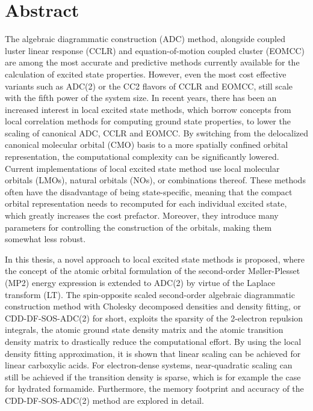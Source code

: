 \chapter*{Abstract}

The algebraic diagrammatic construction (ADC) method, alongside coupled luster linear response (CCLR) and equation-of-motion coupled cluster (EOMCC) are among the most accurate and predictive methods currently available for the calculation of excited state properties. However, even the most cost effective variants such as ADC(2) or the CC2 flavors of CCLR and EOMCC, still scale with the fifth power of the system size. In recent years, there has been an increased interest in local excited state methods, which borrow concepts from local correlation methods for computing ground state properties, to lower the scaling of canonical ADC, CCLR and EOMCC. By switching from the delocalized canonical molecular orbital (CMO) basis to a more spatially confined orbital representation, the computational complexity can be significantly lowered. Current implementations of local excited state method use local molecular orbitals (LMOs), natural orbitals (NOs), or combinations thereof. These methods often have the disadvantage of being state-specific, meaning that the compact orbital representation needs to recomputed for each individual excited state, which greatly increases the cost prefactor. Moreover, they introduce many parameters for controlling the construction of the orbitals, making them somewhat less robust.

In this thesis, a novel approach to local excited state methods is proposed, where the concept of the atomic orbital formulation of the second-order M{\o}ller-Plesset (MP2) energy expression is extended to ADC(2) by virtue of the Laplace transform (LT). The spin-opposite scaled second-order algebraic diagrammatic construction method with Cholesky decomposed densities and density fitting, or CDD-DF-SOS-ADC(2) for short, exploits the sparsity of the 2-electron repulsion integrals, the atomic ground state density matrix and the atomic transition density matrix to drastically reduce the computational effort. By using the local density fitting approximation, it is shown that linear scaling can be achieved for linear carboxylic acids. For electron-dense systems, near-quadratic scaling can still be achieved if the transition density is sparse, which is for example the case for hydrated formamide. Furthermore, the memory footprint and accuracy of the CDD-DF-SOS-ADC(2) method are explored in detail.

